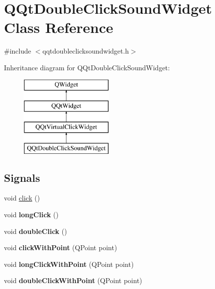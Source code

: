 \hypertarget{class_q_qt_double_click_sound_widget}{}\section{Q\+Qt\+Double\+Click\+Sound\+Widget Class Reference}
\label{class_q_qt_double_click_sound_widget}


{\ttfamily \#include $<$qqtdoubleclicksoundwidget.\+h$>$}

Inheritance diagram for Q\+Qt\+Double\+Click\+Sound\+Widget\+:\begin{figure}[H]
\begin{center}
\leavevmode
\includegraphics[height=4.000000cm]{class_q_qt_double_click_sound_widget}
\end{center}
\end{figure}
\subsection*{Signals}
\begin{DoxyCompactItemize}
\item 
void \mbox{\hyperlink{class_q_qt_double_click_sound_widget_afaad4ed72c009df7ea612c0bec8e2f7d}{click}} ()
\item 
\mbox{\label{class_q_qt_double_click_sound_widget_ae600eb50ac3e412d391489bd84f7cde6}} 
void {\bfseries long\+Click} ()
\item 
\mbox{\label{class_q_qt_double_click_sound_widget_a386ef364946c1f9df6330a70e0886e7a}} 
void {\bfseries double\+Click} ()
\item 
\mbox{\label{class_q_qt_double_click_sound_widget_a162f41b2f6fc12c44606054ae5ee9521}} 
void {\bfseries click\+With\+Point} (Q\+Point point)
\item 
\mbox{\label{class_q_qt_double_click_sound_widget_a75166f7da676a85102955879d733e28f}} 
void {\bfseries long\+Click\+With\+Point} (Q\+Point point)
\item 
\mbox{\label{class_q_qt_double_click_sound_widget_a27e0bb5301639be910c53c9ecb008932}} 
void {\bfseries double\+Click\+With\+Point} (Q\+Point point)
\end{DoxyCompactItemize}
